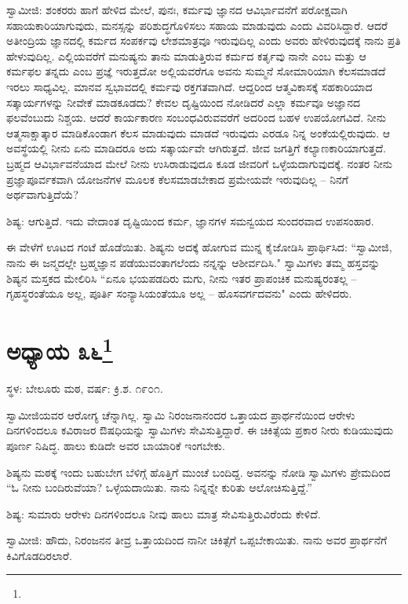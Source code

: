 ಸ್ವಾಮೀಜಿ: ಶಂಕರರು ಹಾಗೆ ಹೇಳಿದ ಮೇಲೆ, ಪುನಃ, ಕರ್ಮವು ಜ್ಞಾನದ ಆವಿರ್ಭಾವನೆಗೆ ಪರೋಕ್ಷವಾಗಿ ಸಹಾಯಕಾರಿಯಾಗುವುದು, ಮನಸ್ಸನ್ನು ಪರಿಶುದ್ಧಗೊಳಿಸಲು ಸಹಾಯ ಮಾಡುವುದು ಎಂದು ವಿವರಿಸಿದ್ದಾರೆ. ಆದರೆ ಅತೀಂದ್ರಿಯ ಜ್ಞಾನದಲ್ಲಿ ಕರ್ಮದ ಸಂಪರ್ಕವು ಲೇಶಮಾತ್ರವೂ ಇರುವುದಿಲ್ಲ ಎಂದು ಅವರು ಹೇಳಿರುವುದಕ್ಕೆ ನಾನು ಪ್ರತಿ ಹೇಳುವುದಿಲ್ಲ. ಎಲ್ಲಿಯವರೆಗೆ ಮನುಷ್ಯನು ತಾನು ಮಾಡುತ್ತಿರುವ ಕರ್ಮದ ಕರ್ತೃವು ನಾನೇ ಎಂಬ ಮತ್ತು ಆ ಕರ್ಮಫಲ ತನ್ನದು ಎಂಬ ಪ್ರಜ್ಞೆ ಇರುತ್ತದೋ ಅಲ್ಲಿಯವರೆಗೂ ಅವನು ಸುಮ್ಮನೆ ಸೋಮಾರಿಯಾಗಿ ಕೆಲಸಮಾಡದೆ ಇರಲು ಸಾಧ್ಯವಿಲ್ಲ. ಮಾನವ ಸ್ವಭಾವದಲ್ಲಿ ಕರ್ಮವು ರಕ್ತಗತವಾಗಿದೆ. ಆದ್ದರಿಂದ ಆತ್ಮವಿಕಾಸಕ್ಕೆ ಸಹಕಾರಿಯಾದ ಸತ್ಕಾರ್ಯಗಳನ್ನು ನೀವೇಕೆ ಮಾಡಕೂಡದು? ಕೇವಲ ದೃಷ್ಟಿಯಿಂದ ನೋಡಿದರೆ ಎಲ್ಲಾ ಕರ್ಮವೂ ಅಜ್ಞಾನದ ಫಲವೆಂಬುದು ನಿಶ್ಚಯ. ಆದರೆ ಕಾರ್ಯಕಾರಣ ಸಂಬಂಧವಿರುವವರೆಗೆ ಅದರಿಂದ ಬಹಳ ಉಪಯೋಗವಿದೆ. ನೀನು ಆತ್ಮಸಾಕ್ಷಾತ್ಕಾರ ಮಾಡಿಕೊಂಡಾಗ ಕೆಲಸ ಮಾಡುವುದು ಮಾಡದೆ ಇರುವುದು ಎರಡೂ ನಿನ್ನ ಅಂಕೆಯಲ್ಲಿರುವುದು. ಆ ಅವಸ್ಥೆಯಲ್ಲಿ ನೀನು ಏನು ಮಾಡಿದರೂ ಅದು ಸತ್ಕಾರ್ಯವೇ ಆಗಿರುತ್ತದೆ. ಜೀವ ಜಗತ್ತಿಗೆ ಕಲ್ಯಾಣಕಾರಿಯಾಗುತ್ತದೆ. ಬ್ರಹ್ಮದ ಆವಿರ್ಭಾವನೆಯಾದ ಮೇಲೆ ನೀನು ಉಸಿರಾಡುವುದೂ ಕೂಡ ಜೀವರಿಗೆ ಒಳ್ಳೆಯದಾಗುವುದಕ್ಕೆ. ನಂತರ ನೀನು ಪ್ರಜ್ಞಾಪೂರ್ವಕವಾಗಿ ಯೋಜನೆಗಳ ಮೂಲಕ ಕೆಲಸಮಾಡಬೇಕಾದ ಪ್ರಮೇಯವೇ ಇರುವುದಿಲ್ಲ – ನಿನಗೆ ಅರ್ಥವಾಗುತ್ತಿದೆಯೆ?

ಶಿಷ್ಯ: ಆಗುತ್ತಿದೆ. ಇದು ವೇದಾಂತ ದೃಷ್ಟಿಯಿಂದ ಕರ್ಮ, ಜ್ಞಾನಗಳ ಸಮನ್ವಯದ ಸುಂದರವಾದ ಉಪಸಂಹಾರ.

ಈ ವೇಳೆಗೆ ಊಟದ ಗಂಟೆ ಹೊಡೆಯಿತು. ಶಿಷ್ಯನು ಅದಕ್ಕೆ ಹೋಗುವ ಮುನ್ನ ಕೈಜೋಡಿಸಿ ಪ್ರಾರ್ಥಿಸಿದ: “ಸ್ವಾಮೀಜಿ, ನಾನು ಈ ಜನ್ಮದಲ್ಲೇ ಬ್ರಹ್ಮಜ್ಞಾನ ಪಡೆಯುವಂತಾಗಲೆಂದು ನನ್ನನ್ನು ಆಶೀರ್ವದಿಸಿ." ಸ್ವಾಮಿಗಳು ತಮ್ಮ ಹಸ್ತವನ್ನು ಶಿಷ್ಯನ ಮಸ್ತಕದ ಮೇಲಿರಿಸಿ “ಏನೂ ಭಯಪಡದಿರು ಮಗು, ನೀನು ಇತರ ಪ್ರಾಪಂಚಿಕ ಮನುಷ್ಯರಂತಲ್ಲ – ಗೃಹಸ್ಥರಂತೆಯೂ ಅಲ್ಲ, ಪೂರ್ತಿ ಸಂನ್ಯಾಸಿಯಂತೆಯೂ ಅಲ್ಲ – ಹೊಸವರ್ಗದವನು" ಎಂದು ಹೇಳಿದರು.

\newpage

\chapter[ಅಧ್ಯಾಯ ೩೬]{ಅಧ್ಯಾಯ ೩೬\protect\footnote{}}

\centerline{ಸ್ಥಳ: ಬೇಲೂರು ಮಠ, ವರ್ಷ: ಕ್ರಿ.ಶ. ೧೯೦೧.}

ಸ್ವಾಮೀಜಿಯವರ ಆರೋಗ್ಯ ಚೆನ್ನಾಗಿಲ್ಲ. ಸ್ವಾಮಿ ನಿರಂಜನಾನಂದರ ಒತ್ತಾಯದ ಪ್ರಾರ್ಥನೆಯಿಂದ ಆರೇಳು ದಿನಗಳಿಂದಲೂ ಕವಿರಾಜರ ಔಷಧಿಯನ್ನು ಸ್ವಾಮಿಗಳು ಸೇವಿಸುತ್ತಿದ್ದಾರೆ. ಈ ಚಿಕಿತ್ಸೆಯ ಪ್ರಕಾರ ನೀರು ಕುಡಿಯುವುದು ಪೂರ್ಣ ನಿಷಿದ್ಧ. ಹಾಲು ಕುಡಿದೇ ಅವರ ಬಾಯಾರಿಕೆ ಇಂಗಬೇಕು.

ಶಿಷ್ಯನು ಮಠಕ್ಕೆ ಇಂದು ಬಹುಬೇಗ ಬೆಳಿಗ್ಗೆ ಹೊತ್ತಿಗೆ ಮುಂಚೆ ಬಂದಿದ್ದ. ಅವನನ್ನು ನೋಡಿ ಸ್ವಾಮಿಗಳು ಪ್ರೇಮದಿಂದ “ಓ ನೀನು ಬಂದಿರುವೆಯಾ? ಒಳ್ಳೆಯದಾಯಿತು. ನಾನು ನಿನ್ನನ್ನೇ ಕುರಿತು ಆಲೋಚಿಸುತ್ತಿದ್ದೆ.”

ಶಿಷ್ಯ: ಸುಮಾರು ಆರೇಳು ದಿನಗಳಿಂದಲೂ ನೀವು ಹಾಲು ಮಾತ್ರ ಸೇವಿಸುತ್ತಿರುವಿರೆಂದು ಕೇಳಿದೆ.

ಸ್ವಾಮೀಜಿ: ಹೌದು, ನಿರಂಜನನ ತೀವ್ರ ಒತ್ತಾಯದಿಂದ ನಾನೀ ಚಿಕಿತ್ಸೆಗೆ ಒಪ್ಪಬೇಕಾಯಿತು. ನಾನು ಅವರ ಪ್ರಾರ್ಥನೆಗೆ ಕಿವಿಗೊಡದಿರಲಾರೆ.

